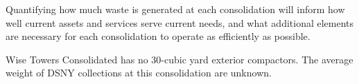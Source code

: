 
    Quantifying how much waste is generated at each consolidation will inform how well current assets and services serve current needs, and what additional elements are necessary for each consolidation to operate as efficiently as possible.
    
    Wise Towers Consolidated has no 30-cubic yard exterior compactors. The average weight of DSNY collections at this consolidation are unknown.